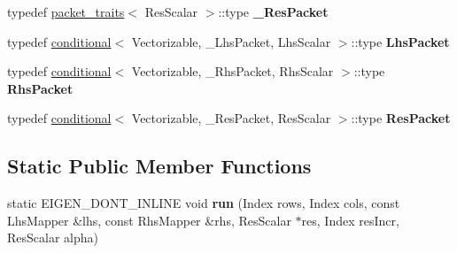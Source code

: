 \begin{DoxyCompactItemize}
\item 
\mbox{\label{struct_eigen_1_1internal_1_1general__matrix__vector__product_3_01_index_00_01_lhs_scalar_00_01_l24320a1e63993864008333cadda60258_a4ec28d44f847984c83adc9e0d507a8b8}} 
typedef \mbox{\hyperlink{struct_eigen_1_1internal_1_1packet__traits}{packet\+\_\+traits}}$<$ Res\+Scalar $>$\+::type {\bfseries \+\_\+\+Res\+Packet}
\item 
\mbox{\label{struct_eigen_1_1internal_1_1general__matrix__vector__product_3_01_index_00_01_lhs_scalar_00_01_l24320a1e63993864008333cadda60258_a197f9dc10db441240fb8a057c48256ad}} 
typedef \mbox{\hyperlink{struct_eigen_1_1internal_1_1conditional}{conditional}}$<$ Vectorizable, \+\_\+\+Lhs\+Packet, Lhs\+Scalar $>$\+::type {\bfseries Lhs\+Packet}
\item 
\mbox{\label{struct_eigen_1_1internal_1_1general__matrix__vector__product_3_01_index_00_01_lhs_scalar_00_01_l24320a1e63993864008333cadda60258_a893602fbf8107460928a5719c0aba439}} 
typedef \mbox{\hyperlink{struct_eigen_1_1internal_1_1conditional}{conditional}}$<$ Vectorizable, \+\_\+\+Rhs\+Packet, Rhs\+Scalar $>$\+::type {\bfseries Rhs\+Packet}
\item 
\mbox{\label{struct_eigen_1_1internal_1_1general__matrix__vector__product_3_01_index_00_01_lhs_scalar_00_01_l24320a1e63993864008333cadda60258_a98df9cc19f5efce862938a7efb2985b6}} 
typedef \mbox{\hyperlink{struct_eigen_1_1internal_1_1conditional}{conditional}}$<$ Vectorizable, \+\_\+\+Res\+Packet, Res\+Scalar $>$\+::type {\bfseries Res\+Packet}
\end{DoxyCompactItemize}
\subsection*{Static Public Member Functions}
\begin{DoxyCompactItemize}
\item 
\mbox{\label{struct_eigen_1_1internal_1_1general__matrix__vector__product_3_01_index_00_01_lhs_scalar_00_01_l24320a1e63993864008333cadda60258_afb8a4749f583d4725c5254d91c9fcbfb}} 
static E\+I\+G\+E\+N\+\_\+\+D\+O\+N\+T\+\_\+\+I\+N\+L\+I\+NE void {\bfseries run} (Index rows, Index cols, const Lhs\+Mapper \&lhs, const Rhs\+Mapper \&rhs, Res\+Scalar $\ast$res, Index res\+Incr, Res\+Scalar alpha)
\end{DoxyCompactItemize}


